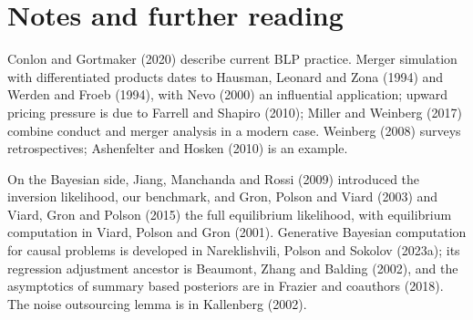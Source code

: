 \section{Notes and further reading}

Conlon and Gortmaker (2020) describe current BLP practice.
Merger simulation with differentiated products dates to Hausman, Leonard and Zona (1994) and
Werden and Froeb (1994), with Nevo (2000) an influential application; upward pricing
pressure is due to Farrell and Shapiro (2010); Miller and Weinberg (2017) combine conduct and
merger analysis in a modern case. Weinberg (2008) surveys retrospectives; Ashenfelter and Hosken (2010) is an example.

On the Bayesian side, Jiang, Manchanda and Rossi (2009) introduced the inversion likelihood, our benchmark, and
Gron, Polson and Viard (2003) and Viard, Gron and Polson (2015) the full equilibrium likelihood, with
equilibrium computation in Viard, Polson and Gron (2001). Generative Bayesian computation for causal problems is developed in
Nareklishvili, Polson and Sokolov (2023a); its regression adjustment ancestor is Beaumont, Zhang and Balding (2002), and the
asymptotics of summary based posteriors are in Frazier and coauthors (2018). The noise outsourcing lemma
is in Kallenberg (2002). 

